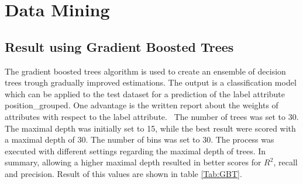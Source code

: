 \section{Data Mining}
\subsection{Result using Gradient Boosted Trees}

The gradient boosted trees algorithm is used to create an ensemble of decision trees trough gradually improved estimations. The output is a classification model which can be applied to the test dataset for a prediction of the label attribute position\_grouped. 
One advantage is the written report about the weights of attributes with respect to the label attribute.~\cite{ref_rapidminergbt}
The number of trees was set to 30. The maximal depth was initially set to 15, while the best result were scored with a maximal depth of 30.
The number of bins was set to 30.  
The process was executed with different settings regarding the maximal depth of trees. In summary, allowing a higher maximal depth resulted in better scores for $R^2$, recall and precision. Result of this values are shown in table \ref{Tab:GBT}.


